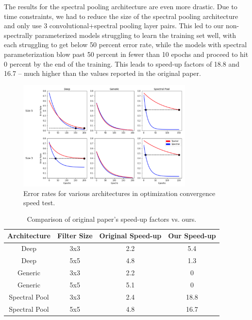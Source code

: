\documentclass[10pt,journal,compsoc]{IEEEtran}
\begin{document}
The results for the spectral pooling architecture are even more drastic. Due to time constraints, we had to reduce the size of the spectral pooling architecture and only use 3 convolutional+spectral pooling layer pairs. This led to our non-spectrally parameterized models struggling to learn the training set well, with each struggling to get below 50 percent error rate, while the models with spectral parameterization blow past 50 percent in fewer than 10 epochs and proceed to hit 0 percent by the end of the training. This leads to speed-up factors of 18.8 and 16.7 -- much higher than the values reported in the original paper.

\begin{figure}
\centering
  \includegraphics[width=250pt]{images/Spectral_Param_Training_Curves.png}
  \caption{Error rates for various architectures in optimization convergence speed test.}
  \label{fig:spectral_param_training_curves}
\end{figure}

\begin{table}[h!]
  \begin{center}
    \caption{Comparison of original paper's speed-up factors vs. ours.}
    \label{tab:Optimization Convergence}
    \begin{tabular}{c|c|c|c}
      \textbf{Architecture} & \textbf{Filter Size} & \textbf{Original Speed-up} & \textbf{Our Speed-up}\\
      \hline
      Deep & 3x3 & 2.2 & 5.4\\
      Deep & 5x5 & 4.8 & 1.3\\
      Generic & 3x3 & 2.2 & 0\\
      Generic & 5x5 & 5.1 & 0\\
      Spectral Pool & 3x3 & 2.4 & 18.8\\
      Spectral Pool & 5x5 & 4.8 & 16.7\\
    \end{tabular}
  \end{center}
\end{table}
\end{document}
